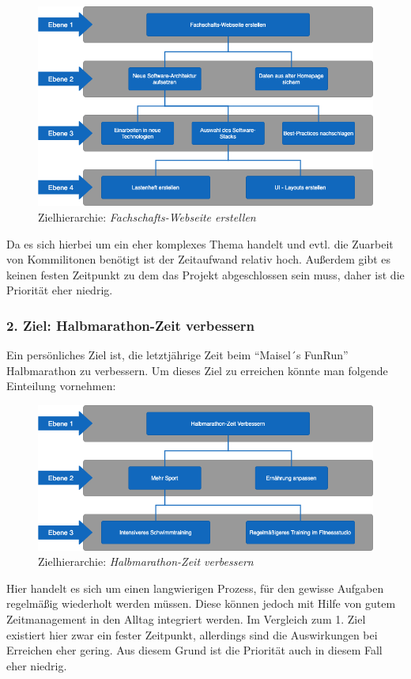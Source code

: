 \begin{figure}[htb]
	\includegraphics[width=\textwidth]{gfx/homepage}
	\caption{Zielhierarchie: \textit{Fachschafts-Webseite erstellen}}
\end{figure}

Da es sich hierbei um ein eher komplexes Thema handelt und evtl. die Zuarbeit von Kommilitonen benötigt ist der Zeitaufwand relativ hoch. Außerdem gibt es keinen festen Zeitpunkt zu dem das Projekt abgeschlossen sein muss, daher ist die Priorität eher niedrig.

\subsubsection{2. Ziel: Halbmarathon-Zeit verbessern}
Ein persönliches Ziel ist, die letztjährige Zeit beim “Maisel´s FunRun” Halbmarathon zu verbessern. Um dieses Ziel zu erreichen könnte man folgende Einteilung vornehmen:

\begin{figure}[htb]
	\includegraphics[width=\textwidth]{gfx/marathon}
	\caption{Zielhierarchie: \textit{Halbmarathon-Zeit verbessern}}
\end{figure}

Hier handelt es sich um einen langwierigen Prozess, für den gewisse Aufgaben regelmäßig wiederholt werden müssen. Diese können jedoch mit Hilfe von gutem Zeitmanagement in den Alltag integriert werden. Im Vergleich zum 1. Ziel existiert hier zwar ein fester Zeitpunkt, allerdings sind die Auswirkungen bei Erreichen eher gering. Aus diesem Grund ist die Priorität auch in diesem Fall eher niedrig.


